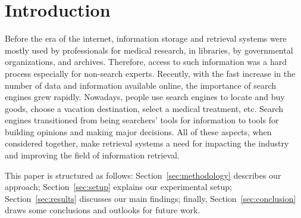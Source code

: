 \section{Introduction}
\label{sec:introduction}

Before the era of the internet, information storage and retrieval systems were mostly
used by professionals for medical research, in libraries, by governmental
organizations, and archives. Therefore, access to such information was a hard process especially
for non-search experts. Recently, with the fast increase in the number of data and information
available online, the importance of search engines grew rapidly. Nowadays, people use
search engines to locate and buy goods, choose a vacation destination, select
a medical treatment, etc. Search engines
transitioned from being searchers' tools for information to tools for building opinions and making
major decisions. All of these aspects, when considered together, make retrieval systems a need for impacting
the industry and improving the field of information retrieval.


This paper is structured as follows: Section~\ref{sec:methodology} describes our
approach; Section~\ref{sec:setup} explains our experimental setup; Section~\ref{sec:results}
discusses our main findings; finally, Section~\ref{sec:conclusion} draws some conclusions and
outlooks for future work.